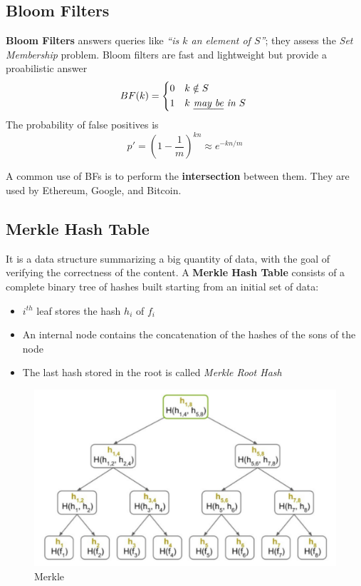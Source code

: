 \subsection{Bloom Filters}
\textbf{Bloom Filters} answers queries like \textit{``is $k$ an element of $S$''}; they assess the \textit{Set Membership} problem. Bloom filters are fast and lightweight but provide a proabilistic answer
\begin{equation}
   BF(k) = 
   \begin{cases*}
      $0$ & $k \notin S$\\
      $1$ & $k \textit{ \ul{may be} in } S$  
   \end{cases*}   
\end{equation}
The probability of false positives is
\begin{equation*}
   p' = \left( 1 - \frac{1}{m}\right) ^{kn} \approx e^{-kn/m}
\end{equation*}

A common use of BFs is to perform the \textbf{intersection} between them.
They are used by Ethereum, Google, and Bitcoin.

\subsection{Merkle Hash Table}
\begin{paracol}{2}
   It is a data structure summarizing a big quantity of data, with the goal of verifying the correctness of the content.
   A \textbf{Merkle Hash Table} consists of a complete binary tree of hashes built starting from an initial set of data:
   \begin{itemize}
      \item $i^{th}$ leaf stores the hash $h_i$ of $f_i$ 
      \item An internal node contains the concatenation of the hashes of the sons of the node
      \item The last hash stored in the root is called \textit{Merkle Root Hash}
   \end{itemize}
   
\switchcolumn

\begin{figure}[htbp]
   \centering
   \includegraphics{images/merkle.png}
   \caption{Merkle}
   \label{fig:merkle}
\end{figure}
\end{paracol}

